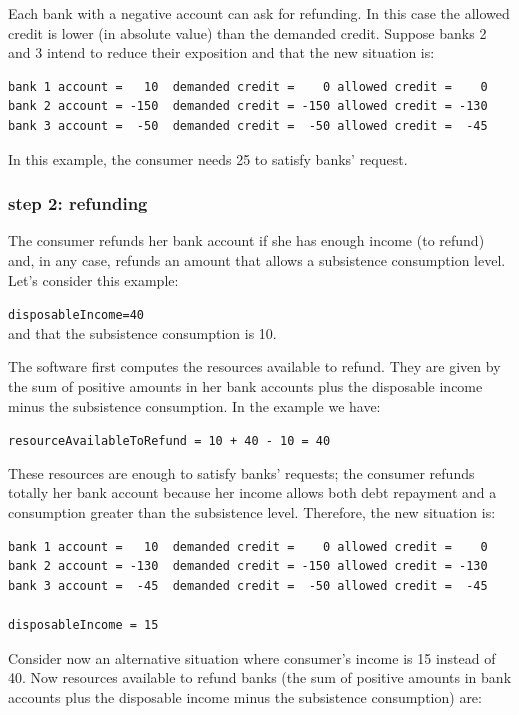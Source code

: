 \documentclass{article}
\begin{document}
Each bank with a negative account can ask for refunding. In this case the allowed credit is lower (in absolute value) than the demanded credit.
Suppose banks 2 and 3 intend to reduce their exposition and that the new situation is:

\begin{verbatim}
bank 1 account =   10  demanded credit =    0 allowed credit =    0
bank 2 account = -150  demanded credit = -150 allowed credit = -130 
bank 3 account =  -50  demanded credit =  -50 allowed credit =  -45
\end{verbatim}

In this example, the consumer needs 25 to satisfy banks' request.

\subsubsection*{step 2: refunding}
The consumer refunds her bank account if she has enough income (to refund) and, in any case, refunds an amount that allows a subsistence consumption level. 
\\Let's consider this example:

\verb+disposableIncome=40+\\
and that the subsistence consumption is 10.

The software first computes the resources available to refund. They are given by 
the sum of positive amounts in her bank accounts plus the disposable income minus the subsistence consumption. In the example we have:

\verb/resourceAvailableToRefund = 10 + 40 - 10 = 40/

These resources are enough to satisfy banks' requests; the consumer refunds totally her bank account because her income allows both debt repayment and a consumption greater than the subsistence level. 
Therefore, the new situation is:

\begin{verbatim}
bank 1 account =   10  demanded credit =    0 allowed credit =    0
bank 2 account = -130  demanded credit = -150 allowed credit = -130 
bank 3 account =  -45  demanded credit =  -50 allowed credit =  -45

disposableIncome = 15
\end{verbatim}



Consider now an alternative situation where consumer's income is 15 instead of 40. Now resources available to refund banks (the sum of positive amounts in bank accounts plus the disposable income minus the subsistence consumption) are:
\end{document}
